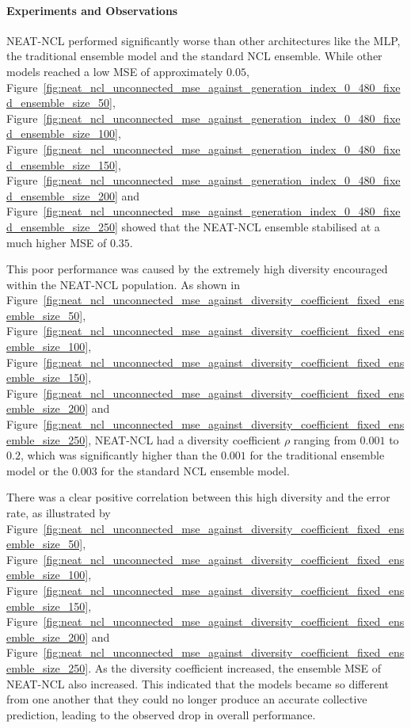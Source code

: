 \documentclass{article}
\begin{document}
\paragraph{Experiments and Observations}
NEAT-NCL performed significantly worse than other architectures like the MLP, the traditional ensemble model and the standard NCL ensemble. While other models reached a low MSE of approximately $0.05$, Figure~\ref{fig:neat_ncl_unconnected_mse_against_generation_index_0_480_fixed_ensemble_size_50}, Figure~\ref{fig:neat_ncl_unconnected_mse_against_generation_index_0_480_fixed_ensemble_size_100}, Figure~\ref{fig:neat_ncl_unconnected_mse_against_generation_index_0_480_fixed_ensemble_size_150}, Figure~\ref{fig:neat_ncl_unconnected_mse_against_generation_index_0_480_fixed_ensemble_size_200} and Figure~\ref{fig:neat_ncl_unconnected_mse_against_generation_index_0_480_fixed_ensemble_size_250} showed that the NEAT-NCL ensemble stabilised at a much higher MSE of $0.35$. 

This poor performance was caused by the extremely high diversity encouraged within the NEAT-NCL population. As shown in Figure~\ref{fig:neat_ncl_unconnected_mse_against_diversity_coefficient_fixed_ensemble_size_50}, Figure~\ref{fig:neat_ncl_unconnected_mse_against_diversity_coefficient_fixed_ensemble_size_100}, Figure~\ref{fig:neat_ncl_unconnected_mse_against_diversity_coefficient_fixed_ensemble_size_150}, Figure~\ref{fig:neat_ncl_unconnected_mse_against_diversity_coefficient_fixed_ensemble_size_200} and Figure~\ref{fig:neat_ncl_unconnected_mse_against_diversity_coefficient_fixed_ensemble_size_250}, NEAT-NCL had a diversity coefficient $\rho$ ranging from $0.001$ to $0.2$, which was significantly higher than the $0.001$ for the traditional ensemble model or the $0.003$ for the standard NCL ensemble model. 

There was a clear positive correlation between this high diversity and the error rate, as illustrated by Figure~\ref{fig:neat_ncl_unconnected_mse_against_diversity_coefficient_fixed_ensemble_size_50}, Figure~\ref{fig:neat_ncl_unconnected_mse_against_diversity_coefficient_fixed_ensemble_size_100}, Figure~\ref{fig:neat_ncl_unconnected_mse_against_diversity_coefficient_fixed_ensemble_size_150}, Figure~\ref{fig:neat_ncl_unconnected_mse_against_diversity_coefficient_fixed_ensemble_size_200} and Figure~\ref{fig:neat_ncl_unconnected_mse_against_diversity_coefficient_fixed_ensemble_size_250}. As the diversity coefficient increased, the ensemble MSE of NEAT-NCL also increased. This indicated that the models became so different from one another that they could no longer produce an accurate collective prediction, leading to the observed drop in overall performance. 
\end{document}
